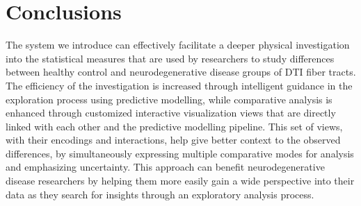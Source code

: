 \section{Conclusions}

\noindent The system we introduce can effectively facilitate a deeper physical investigation into the statistical measures that are used by researchers to study differences between healthy control and neurodegenerative disease groups of DTI fiber tracts. The efficiency of the investigation is increased through intelligent guidance in the exploration process using predictive modelling, while comparative analysis is enhanced through customized interactive visualization views that are directly linked with each other and the predictive modelling pipeline. This set of views, with their encodings and interactions, help give better context to the observed differences, by simultaneously expressing multiple comparative modes for analysis and emphasizing uncertainty. This approach can benefit neurodegenerative disease researchers by helping them more easily gain a wide perspective into their data as they search for insights through an exploratory analysis process.

